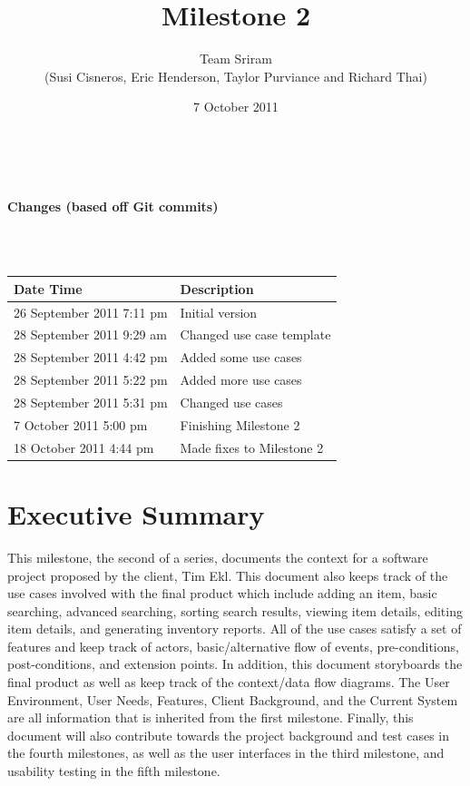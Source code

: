 \documentclass{article}
\begin{document}
\setlength{\voffset}{3.5in}
\title{Milestone 2}
\author{Team Sriram\\
(Susi Cisneros, Eric Henderson, Taylor Purviance and Richard Thai)}
\date{7 October 2011}
\maketitle
\clearpage
\setlength{\voffset}{0pt}
\tableofcontents
\clearpage
~\\
\begin{Large}\textbf{Changes (based off Git commits)}\end{Large}\\
~\\
\begin{tabular}{ | p{2in} | p{4.5in} | }
\hline
\textbf{Date Time} & \textbf{Description}\\
\hline
\hline
26 September 2011 7:11 pm & Initial version\\
\hline
28 September 2011 9:29 am & Changed use case template\\
\hline
28 September 2011 4:42 pm & Added some use cases\\
\hline
28 September 2011 5:22 pm & Added more use cases\\
\hline
28 September 2011 5:31 pm & Changed use cases\\
\hline
7 October 2011 5:00 pm & Finishing Milestone 2\\
\hline
18 October 2011 4:44 pm & Made fixes to Milestone 2\\
\hline
\end{tabular}
\clearpage

\section{Executive Summary}
This milestone, the second of a series, documents the context for a software project proposed by the client, Tim Ekl. This document also keeps track of the use cases involved with the final product which include adding an item, basic searching, advanced searching, sorting search results, viewing item details, editing item details, and generating inventory reports. All of the use cases satisfy a set of features and keep track of actors, basic/alternative flow of events, pre-conditions, post-conditions, and extension points. In addition, this document storyboards the final product as well as keep track of the context/data flow diagrams.  The User Environment, User Needs, Features, Client Background, and the Current System are all information that is inherited from the first milestone.  Finally, this document will also contribute towards the project background and test cases in the fourth milestones, as well as the user interfaces in the third milestone, and usability testing in the fifth milestone.
\end{document}
